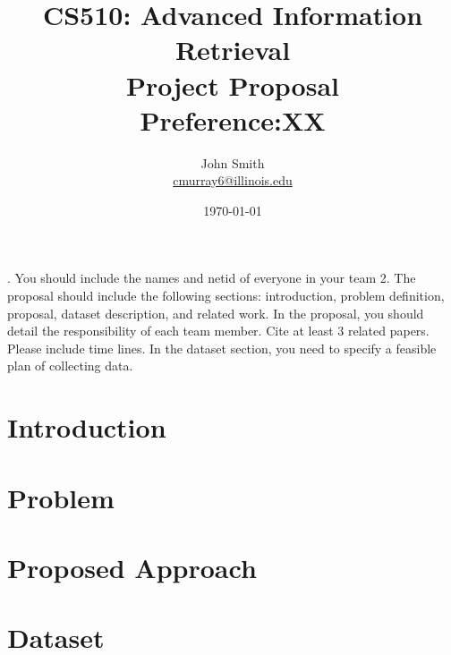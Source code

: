 \documentclass{article}
\title{\vspace{-3.0cm}CS510: Advanced Information Retrieval \\ Project Proposal \\ Preference:XX}
\author{John Smith \\
\href{mailto:cmurray6@illinois.edu}{cmurray6@illinois.edu}}
\date{\today}
\begin{document}
. You should include the names and netid of everyone in your team
2. The proposal should include the following sections: introduction, problem definition, proposal, dataset description, and related work. In the proposal, you should detail the responsibility of each team member. Cite at least 3 related papers. Please include time lines. In the dataset section, you need to specify a feasible plan of collecting data. 

\section{Introduction}

\label{introduction}

\section{Problem}

\label{problem}

\section{Proposed Approach}

\label{proposed-approach}

\section{Dataset}

\label{dataset}




 
\end{document}
